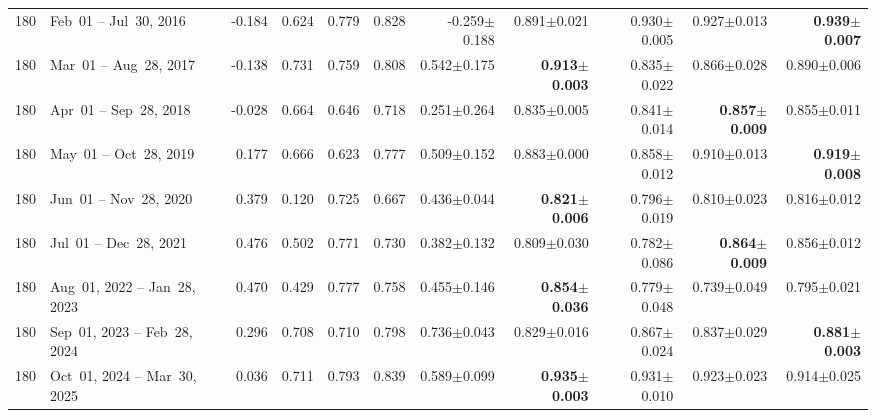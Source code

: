 \begin{longtable}{r l r r r r r r r r r}
180 & Feb~01 -- Jul~30, 2016 & -0.184 & 0.624 & 0.779 & 0.828 & -0.259{\tiny$\pm$0.188} & 0.891{\tiny$\pm$0.021} & 0.930{\tiny$\pm$0.005} & 0.927{\tiny$\pm$0.013} & \textbf{0.939{\tiny$\pm$0.007}} \\
180 & Mar~01 -- Aug~28, 2017 & -0.138 & 0.731 & 0.759 & 0.808 & 0.542{\tiny$\pm$0.175} & \textbf{0.913{\tiny$\pm$0.003}} & 0.835{\tiny$\pm$0.022} & 0.866{\tiny$\pm$0.028} & 0.890{\tiny$\pm$0.006} \\
180 & Apr~01 -- Sep~28, 2018 & -0.028 & 0.664 & 0.646 & 0.718 & 0.251{\tiny$\pm$0.264} & 0.835{\tiny$\pm$0.005} & 0.841{\tiny$\pm$0.014} & \textbf{0.857{\tiny$\pm$0.009}} & 0.855{\tiny$\pm$0.011} \\
180 & May~01 -- Oct~28, 2019 & 0.177 & 0.666 & 0.623 & 0.777 & 0.509{\tiny$\pm$0.152} & 0.883{\tiny$\pm$0.000} & 0.858{\tiny$\pm$0.012} & 0.910{\tiny$\pm$0.013} & \textbf{0.919{\tiny$\pm$0.008}} \\
180 & Jun~01 -- Nov~28, 2020 & 0.379 & 0.120 & 0.725 & 0.667 & 0.436{\tiny$\pm$0.044} & \textbf{0.821{\tiny$\pm$0.006}} & 0.796{\tiny$\pm$0.019} & 0.810{\tiny$\pm$0.023} & 0.816{\tiny$\pm$0.012} \\
180 & Jul~01 -- Dec~28, 2021 & 0.476 & 0.502 & 0.771 & 0.730 & 0.382{\tiny$\pm$0.132} & 0.809{\tiny$\pm$0.030} & 0.782{\tiny$\pm$0.086} & \textbf{0.864{\tiny$\pm$0.009}} & 0.856{\tiny$\pm$0.012} \\
180 & Aug~01, 2022 -- Jan~28, 2023 & 0.470 & 0.429 & 0.777 & 0.758 & 0.455{\tiny$\pm$0.146} & \textbf{0.854{\tiny$\pm$0.036}} & 0.779{\tiny$\pm$0.048} & 0.739{\tiny$\pm$0.049} & 0.795{\tiny$\pm$0.021} \\
180 & Sep~01, 2023 -- Feb~28, 2024 & 0.296 & 0.708 & 0.710 & 0.798 & 0.736{\tiny$\pm$0.043} & 0.829{\tiny$\pm$0.016} & 0.867{\tiny$\pm$0.024} & 0.837{\tiny$\pm$0.029} & \textbf{0.881{\tiny$\pm$0.003}} \\
180 & Oct~01, 2024 -- Mar~30, 2025 & 0.036 & 0.711 & 0.793 & 0.839 & 0.589{\tiny$\pm$0.099} & \textbf{0.935{\tiny$\pm$0.003}} & 0.931{\tiny$\pm$0.010} & 0.923{\tiny$\pm$0.023} & 0.914{\tiny$\pm$0.025} \\
\end{longtable}
\endgroup


